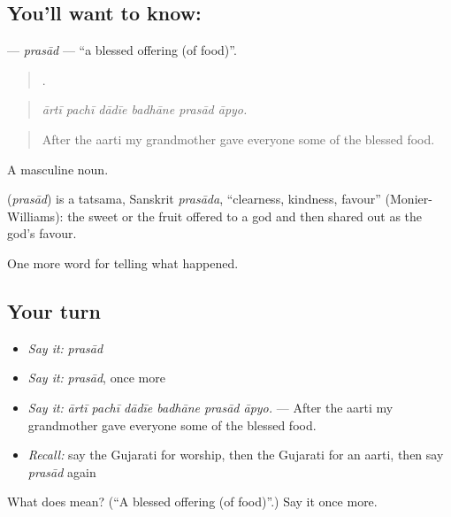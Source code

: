 \subsection*{You'll want to know: }
\textbf{} — \emph{prasād} — \textquotedblleft{}a blessed offering (of food)\textquotedblright{}.

\begin{quote}
     .
\end{quote}

\begin{quote}
\emph{ārtī pachī dādīe badhāne prasād āpyo.}
\end{quote}

\begin{quote}
After the aarti my grandmother gave everyone some of the blessed food.
\end{quote}

A masculine noun.

\begin{cousinweb}
\textbf{} (\emph{prasād}) is a tatsama, Sanskrit \emph{prasāda}, \textquotedblleft{}clearness, kindness, favour\textquotedblright{} (Monier-Williams): the sweet or the fruit offered to a god and then shared out as the god's favour.
\end{cousinweb}

\begin{grammarlens}[title={What you've built}]
One more word for telling what happened.
\end{grammarlens}

\subsection*{Your turn}
\begin{itemize}
\raggedright
  \item \emph{Say it:} \emph{prasād}
  \item \emph{Say it:} \emph{prasād}, once more
  \item \emph{Say it:} \emph{ārtī pachī dādīe badhāne prasād āpyo.} — After the aarti my grandmother gave everyone some of the blessed food.
  \item \emph{Recall:} say the Gujarati for worship, then the Gujarati for an aarti, then say \emph{prasād} again
\end{itemize}

\begin{tcolorbox}[breakable,colback=teal!4,colframe=teal!35!black,title={Before you move on}]
What does  mean? (\textquotedblleft{}A blessed offering (of food)\textquotedblright{}.) Say it once more.
\end{tcolorbox}

